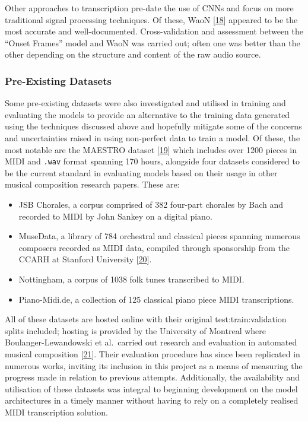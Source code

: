 \documentclass[12pt,]{article}
\providecommand{\tightlist}{%
  \setlength{\itemsep}{0pt}\setlength{\parskip}{0pt}}
\begin{document}
Other approaches to transcription pre-date the use of CNNs and focus on
more traditional signal processing techniques. Of these, WaoN
{[}\protect\hyperlink{ref-waon}{18}{]} appeared to be the most accurate
and well-documented. Cross-validation and assessment between the ``Onset
Frames'' model and WaoN was carried out; often one was better than the
other depending on the structure and content of the raw audio source.

\hypertarget{pre-existing-datasets}{%
\subsubsection{Pre-Existing Datasets}\label{pre-existing-datasets}}

Some pre-existing datasets were also investigated and utilised in
training and evaluating the models to provide an alternative to the
training data generated using the techniques discussed above and
hopefully mitigate some of the concerns and uncertainties raised in
using non-perfect data to train a model. Of these, the most notable are
the MAESTRO dataset {[}\protect\hyperlink{ref-maestro2018}{19}{]} which
includes over 1200 pieces in MIDI and \texttt{.wav} format spanning 170
hours, alongside four datasets considered to be the current standard in
evaluating models based on their usage in other musical composition
research papers. These are:

\begin{itemize}
\tightlist
\item
  JSB Chorales, a corpus comprised of 382 four-part chorales by Bach and
  recorded to MIDI by John Sankey on a digital piano.
\item
  MuseData, a library of 784 orchestral and classical pieces spanning
  numerous composers recorded as MIDI data, compiled through sponsorship
  from the CCARH at Stanford University
  {[}\protect\hyperlink{ref-ccarh}{20}{]}.
\item
  Nottingham, a corpus of 1038 folk tunes transcribed to MIDI.
\item
  Piano-Midi.de, a collection of 125 classical piano piece MIDI
  transcriptions.
\end{itemize}

All of these datasets are hosted online with their original
test:train:validation splits included; hosting is provided by the
University of Montreal where Boulanger-Lewandowski et al.~carried out
research and evaluation in automated musical composition
{[}\protect\hyperlink{ref-boulanger2012modeling}{21}{]}. Their
evaluation procedure has since been replicated in numerous works,
inviting its inclusion in this project as a means of measuring the
progress made in relation to previous attempts. Additionally, the
availability and utilisation of these datasets was integral to beginning
development on the model architectures in a timely manner without having
to rely on a completely realised MIDI transcription solution.
\end{document}
